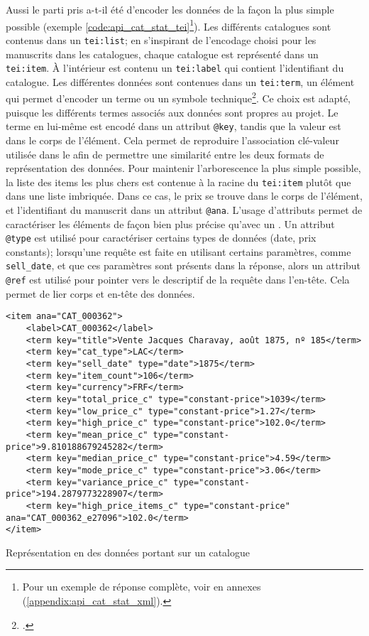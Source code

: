 Aussi le parti pris a-t-il été d'encoder les données de la façon la plus simple possible (exemple \ref{code:api_cat_stat_tei}\footnote{
	Pour un exemple de réponse complète, voir en annexes (\ref{appendix:api_cat_stat_xml}).
}). Les différents catalogues sont contenus dans un \texttt{tei:list}; en s'inspirant de l'encodage choisi pour les manuscrits dans les catalogues, chaque catalogue est représenté dans un \texttt{tei:item}. À l'intérieur est contenu un \texttt{tei:label} qui contient l'identifiant du catalogue. Les différentes données sont contenues dans un \texttt{tei:term}, un élément qui permet d'encoder un terme ou un symbole technique\footcite{tei_consortium_p5_2022}. Ce choix est adapté, puisque les différents termes associés aux données sont propres au projet. Le terme en lui-même est encodé dans un attribut \texttt{@key}, tandis que la valeur est dans le corps de l'élément. Cela permet de reproduire l'association clé-valeur utilisée dans le \json{} afin de permettre une similarité entre les deux formats de représentation des données. Pour maintenir l'arborescence la plus simple possible, la liste des items les plus chers est contenue à la racine du \texttt{tei:item} plutôt que dans une liste imbriquée. Dans ce cas, le prix se trouve dans le corps de l'élément, et l'identifiant du manuscrit dans un attribut \texttt{@ana}. L'usage d'attributs permet de caractériser les éléments de façon bien plus précise qu'avec un \json{}. Un attribut \texttt{@type} est utilisé pour caractériser certains types de données (date, prix constants); lorsqu'une requête est faite en utilisant certains paramètres, comme \texttt{sell\_date}, et que ces paramètres sont présents dans la réponse, alors un attribut \texttt{@ref} est utilisé pour pointer vers le descriptif de la requête dans l'en-tête. Cela permet de lier corps et en-tête des données.

\begin{listing}[h!]
	\begin{verbatim}
<item ana="CAT_000362">
	<label>CAT_000362</label>
	<term key="title">Vente Jacques Charavay, août 1875, nº 185</term>
	<term key="cat_type">LAC</term>
	<term key="sell_date" type="date">1875</term>
	<term key="item_count">106</term>
	<term key="currency">FRF</term>
	<term key="total_price_c" type="constant-price">1039</term>
	<term key="low_price_c" type="constant-price">1.27</term>
	<term key="high_price_c" type="constant-price">102.0</term>
	<term key="mean_price_c" type="constant-price">9.810188679245282</term>
	<term key="median_price_c" type="constant-price">4.59</term>
	<term key="mode_price_c" type="constant-price">3.06</term>
	<term key="variance_price_c" type="constant-price">194.2879773228907</term>
	<term key="high_price_items_c" type="constant-price" ana="CAT_000362_e27096">102.0</term>
</item>
	\end{verbatim}
	\caption{Représentation en \xmltei{} des données portant sur un catalogue}
	\label{code:api_cat_stat_tei}
\end{listing}

